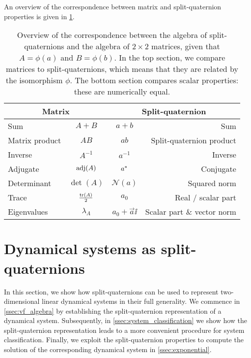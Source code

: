 An overview of the correspondence between matrix and split-quaternion properties is given in \cref{tab:spquat_matrices}.


\renewcommand{\arraystretch}{1.3}
\begin{table}[ht!]
    \centering
    \caption{Overview of the correspondence between the algebra of split-quaternions and the algebra of \(2\times2\) matrices, given that \(A = \phi(a)\) and \(B = \phi(b)\). In the top section, we compare matrices to split-quaternions, which means that they are related by the isomorphism \(\phi\). The bottom section compares scalar properties: these are numerically equal.}
    \label{tab:spquat_matrices}
    \begin{tabular}{lc|cr}
    \toprule
        \multicolumn{2}{c}{\textbf{Matrix}} & \multicolumn{2}{c}{\textbf{Split-quaternion}} \\
    \midrule
        Sum      & \( A + B \)      & \( a + b\) & Sum \\
        Matrix product  & \( AB \)  & \( ab\) & Split-quaternion product \\
        Inverse  & \(A^{-1}\)       & \(a^{-1}\) & Inverse \\
        Adjugate & \(\operatorname{adj}(A)\) & \(a^*\) & Conjugate \\
        \midrule
        Determinant & \(\det(A)\) & \(\mathscr{N}(a)\) & Squared norm \\
        Trace       & \(\frac{\trace(A)}{2}\) & \(a_0\) & Real / scalar part \\
        Eigenvalues \hspace{1.5cm} & \(\lambda_{A} \) & \( a_0 + \vec{a}\ii \) & Scalar part \& vector norm \\
    \bottomrule
    \end{tabular}
\end{table}
\renewcommand{\arraystretch}{1}

\section{Dynamical systems as split-quaternions}
\label{sec:system_classification}
In this section, we show how split-quaternions can be used to represent two-dimensional linear dynamical systems in their full generality. We commence in \cref{ssec:vf_algebra} by establishing the split-quaternion representation of a dynamical system. Subsequently, in \cref{ssec:system_classification} we show how the split-quaternion representation leads to a more convenient procedure for system classification. Finally, we exploit the split-quaternion properties to compute the solution of the corresponding dynamical system in \cref{ssec:exponential}.

